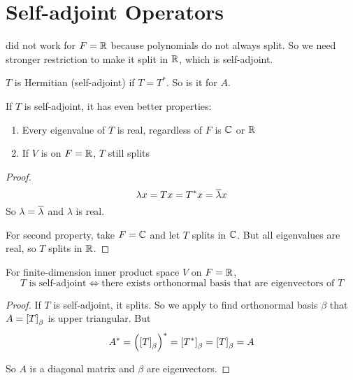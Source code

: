 \section{Self-adjoint Operators}

 did not work for $F=\mathbb{R}$ because polynomials do not always split. So we need stronger restriction to make it split in $\mathbb{R}$, which is self-adjoint.

\begin{definition}
    $T$ is Hermitian (self-adjoint) if $T = T^*$. So is it for $A$.
\end{definition}

\begin{theorem}
    If $T$ is self-adjoint, it has even better properties:
\begin{enumerate}
    \item Every eigenvalue of $T$ is real, regardless of $F$ is $\mathbb{C}$ or $\mathbb{R}$
    \item If $V$ is on $F=\mathbb{R}$, $T$ still splits
\end{enumerate}
\end{theorem}
\begin{proof}
    \begin{equation*}
        \lambda x = Tx = T^* x = \overline{\lambda} x
    \end{equation*}
    So $\lambda = \overline{\lambda}$ and $\lambda$ is real.
    
    For second property, take $F=\mathbb{C}$ and let $T$ splits in $\mathbb{C}$. But all eigenvalues are real, so $T$ splits in $\mathbb{R}$.
\end{proof}

\begin{theorem}
    For finite-dimension inner product space $V$ on $F=\mathbb{R}$, 
    \begin{equation}
        T \text{ is self-adjoint} \Leftrightarrow \text{there exists orthonormal basis that are eigenvectors of } T
    \end{equation}
\end{theorem}
\begin{proof}
    If $T$ is self-adjoint, it splits. So we apply  to find orthonormal basis $\beta$ that $A = \coordinate{T}_\beta$ is upper triangular. But
    \begin{equation*}
        A^* = \mleft(\coordinate{T}_\beta\mright)^* = \coordinate{T^*}_\beta = \coordinate{T}_\beta = A
    \end{equation*}
    
    So $A$ is a diagonal matrix and $\beta$ are eigenvectors.
\end{proof}

